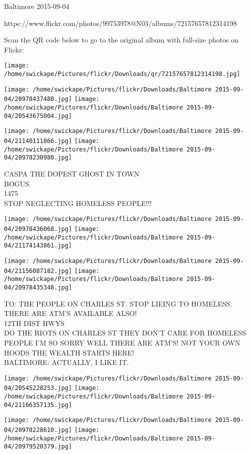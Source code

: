 \documentclass[10pt,letterpaper]{article}
\begin{document}
Baltimore 2015-09-04

https://www.flickr.com/photos/99753978@N03/albums/72157657812314198

Scan the QR code below to go to the original album with full-size photos on Flickr:

\texttt{[image: /home/swickape/Pictures/flickr/Downloads/qr/72157657812314198.jpg]}
\pagebreak

\texttt{[image: /home/swickape/Pictures/flickr/Downloads/Baltimore 2015-09-04/20978437488.jpg]}
\texttt{[image: /home/swickape/Pictures/flickr/Downloads/Baltimore 2015-09-04/20543675004.jpg]}

\texttt{[image: /home/swickape/Pictures/flickr/Downloads/Baltimore 2015-09-04/21140111866.jpg]}
\texttt{[image: /home/swickape/Pictures/flickr/Downloads/Baltimore 2015-09-04/20978230980.jpg]}

CASPA THE DOPEST GHOST IN TOWN\\
BOGUS\\
1475\\
STOP NEGLECTING HOMELESS PEOPLE!!!\\
\pagebreak

\texttt{[image: /home/swickape/Pictures/flickr/Downloads/Baltimore 2015-09-04/20978436068.jpg]}
\texttt{[image: /home/swickape/Pictures/flickr/Downloads/Baltimore 2015-09-04/21174143861.jpg]}

\texttt{[image: /home/swickape/Pictures/flickr/Downloads/Baltimore 2015-09-04/21156087182.jpg]}
\texttt{[image: /home/swickape/Pictures/flickr/Downloads/Baltimore 2015-09-04/20978435348.jpg]}

TO: THE PEOPLE ON CHARLES ST. STOP LIEING TO HOMELESS.  THERE ARE ATM'S AVAILABLE ALSO!\\
12TH DIST HWYS\\
DO THE RIOTS ON CHARLES ST THEY DON'T CARE FOR HOMELESS PEOPLE I'M SO SORRY WELL THERE ARE ATM'S!  NOT YOUR OWN HOODS THE WEALTH STARTS HERE!\\
BALTIMORE: ACTUALLY, I LIKE IT.\\
\pagebreak

\texttt{[image: /home/swickape/Pictures/flickr/Downloads/Baltimore 2015-09-04/20545228253.jpg]}
\texttt{[image: /home/swickape/Pictures/flickr/Downloads/Baltimore 2015-09-04/21166357135.jpg]}

\texttt{[image: /home/swickape/Pictures/flickr/Downloads/Baltimore 2015-09-04/20978228610.jpg]}
\texttt{[image: /home/swickape/Pictures/flickr/Downloads/Baltimore 2015-09-04/20979520379.jpg]}
\end{document}
